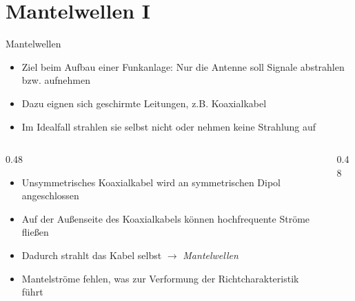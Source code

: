 \section{Mantelwellen I}
\label{section:mantelwellen_1}
\begin{frame}{Mantelwellen}
    \begin{itemize}
        \item Ziel beim Aufbau einer Funkanlage: Nur die Antenne soll Signale abstrahlen bzw. aufnehmen
        \item Dazu eignen sich geschirmte Leitungen, z.B. Koaxialkabel
        \item Im Idealfall strahlen sie selbst nicht oder nehmen keine Strahlung auf
    \end{itemize}
\end{frame}

\begin{frame}
    \begin{columns}
        \begin{column}{0.48\textwidth}
            \begin{itemize}
                \item Unsymmetrisches Koaxialkabel wird an symmetrischen Dipol angeschlossen
                \item Auf der Außenseite des Koaxialkabels können hochfrequente Ströme fließen
                \item Dadurch strahlt das Kabel selbst $\rightarrow$ \emph{Mantelwellen}
                \item Mantelströme fehlen, was zur Verformung der Richtcharakteristik führt
            \end{itemize}

        \end{column}
        \begin{column}{0.48\textwidth}
            \footnotesize
        \end{column}
    \end{columns}

\end{frame}

